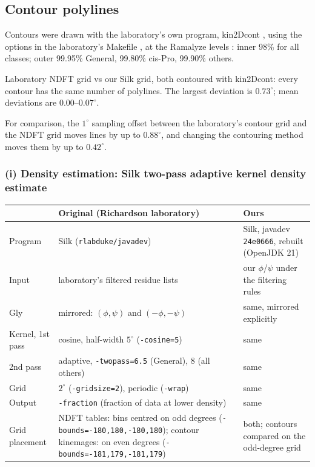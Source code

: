 \documentclass[11pt]{article}
\newcommand{\file}[1]{\texttt{#1}}
\begin{document}
\subsection{Contour polylines}

Contours were drawn with the laboratory's own program, kin2Dcont \cite{kincontours}, using the
options in the laboratory's Makefile \cite{referencedata}, at the Ramalyze levels
\cite{javadev}: inner 98\% for all classes; outer 99.95\% General, 99.80\% cis-Pro, 99.90\%
others.

Laboratory NDFT grid vs our Silk grid, both contoured with kin2Dcont: every contour has the same
number of polylines. The largest deviation is $0.73^\circ$; mean deviations are
$0.00$--$0.07^\circ$.

For comparison, the $1^\circ$ sampling offset between the laboratory's contour grid and the NDFT
grid moves lines by up to $0.88^\circ$, and changing the contouring method moves them by up to
$0.42^\circ$.

\subsubsection*{(i) Density estimation: Silk two-pass adaptive kernel density estimate}

\begin{center}
\small
\begin{tabularx}{\linewidth}{@{}l>{\raggedright\arraybackslash}X>{\raggedright\arraybackslash}X@{}}
  \toprule
  & Original (Richardson laboratory) & Ours \\
  \midrule
  Program & Silk (\file{rlabduke/javadev}) & Silk, javadev \file{24e0666}, rebuilt (OpenJDK 21) \\
  Input & laboratory's filtered residue lists & our $\phi$/$\psi$ under the filtering rules \\
  Gly & mirrored: $(\phi,\psi)$ and $(-\phi,-\psi)$ & same, mirrored explicitly \\
  Kernel, 1st pass & cosine, half-width $5^\circ$ (\file{-cosine=5}) & same \\
  2nd pass & adaptive, \file{-twopass=6.5} (General), 8 (all others) & same \\
  Grid & $2^\circ$ (\file{-gridsize=2}), periodic (\file{-wrap}) & same \\
  Output & \file{-fraction} (fraction of data at lower density) & same \\
  Grid placement & NDFT tables: bins centred on odd degrees (\file{-bounds=-180,180,-180,180});
    contour kinemages: on even degrees (\file{-bounds=-181,179,-181,179})
    & both; contours compared on the odd-degree grid \\
  \bottomrule
\end{tabularx}
\end{center}
\end{document}
